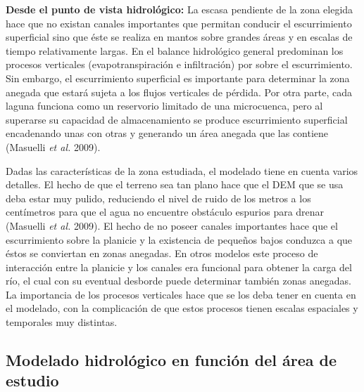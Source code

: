 \documentclass[10pt,a4paper, twoside]{report}
\begin{document}
\textbf{Desde el punto de vista hidrológico:} La escasa pendiente de la zona elegida hace que no existan canales importantes que permitan conducir el escurrimiento superficial sino que éste se realiza en mantos sobre grandes áreas y en escalas de tiempo relativamente largas. En el balance hidrológico general predominan los procesos verticales (evapotranspiración e infiltración) por sobre el escurrimiento. Sin embargo, el escurrimiento superficial es importante para determinar la zona anegada que estará sujeta a los flujos verticales de pérdida. Por otra parte, cada laguna funciona como un reservorio limitado de una microcuenca, pero al superarse su capacidad de almacenamiento se produce escurrimiento superficial encadenando unas con otras y generando un área anegada que las contiene (Masuelli \textit{et al.} 2009).

Dadas las características de la zona estudiada, el modelado tiene en cuenta varios detalles. El hecho de que el terreno sea tan plano hace que el DEM que se usa deba estar muy pulido, reduciendo el nivel de ruido de los metros a los centímetros para que el agua no encuentre obstáculo espurios para drenar (Masuelli \textit{et al.} 2009). El hecho de no poseer canales importantes hace que el escurrimiento sobre la planicie y la existencia de pequeños bajos conduzca a que éstos se conviertan en zonas anegadas. En otros modelos este proceso de interacción entre la planicie y los canales era funcional para obtener la carga del río, el cual con su eventual desborde puede determinar también zonas anegadas. La importancia de los procesos verticales hace que se los deba tener en cuenta en el modelado, con la complicación de que estos procesos tienen escalas espaciales y temporales muy distintas.



\subsection{Modelado hidrológico en función del área de estudio}
\end{document}
